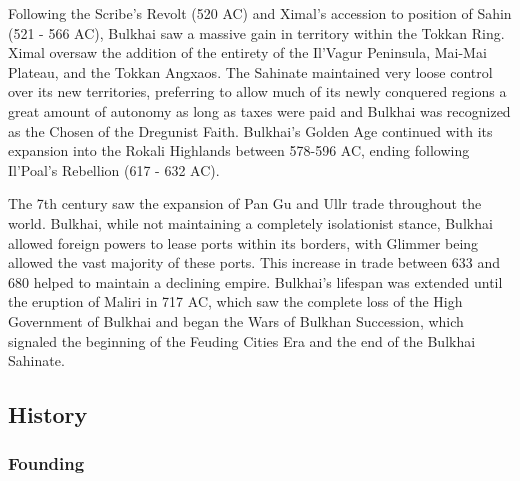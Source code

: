 	Following the Scribe's Revolt (520 AC) and Ximal's accession to position of Sahin (521 - 566 AC), Bulkhai saw a massive gain in territory within the Tokkan Ring. Ximal oversaw the addition of the entirety of the Il'Vagur Peninsula, Mai-Mai Plateau, and the Tokkan Angxaos. The Sahinate maintained very loose control over its new territories, preferring to allow much of its newly conquered regions a great amount of autonomy as long as taxes were paid and Bulkhai was recognized as the Chosen of the Dregunist Faith. Bulkhai's Golden Age continued with its expansion into the Rokali Highlands between 578-596 AC, ending following Il'Poal's Rebellion (617 - 632 AC).
	
	The 7th century saw the expansion of Pan Gu and Ullr trade throughout the world. Bulkhai, while not maintaining a completely isolationist stance, Bulkhai allowed foreign powers to lease ports within its borders, with Glimmer being allowed the vast majority of these ports. This increase in trade between 633 and 680 helped to maintain a declining empire. Bulkhai's lifespan was extended until the eruption of Maliri in 717 AC, which saw the complete loss of the High Government of Bulkhai and began the Wars of Bulkhan Succession, which signaled the beginning of the Feuding Cities Era and the end of the Bulkhai Sahinate.
	
\subsection{History}	
	\subsubsection{Founding}

